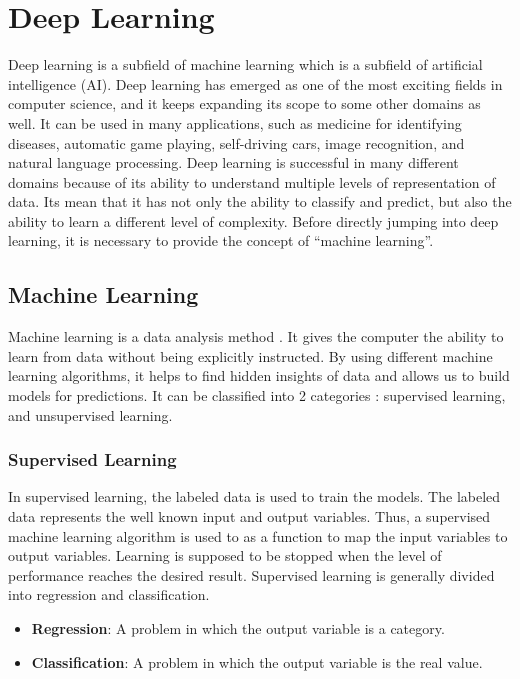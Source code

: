 \chapter{Deep Learning}

Deep learning is a subfield of machine learning which is a subfield of artificial intelligence (AI). Deep learning has emerged as one of the most exciting fields in computer science, and it keeps expanding its scope to some other domains as well. It can be used in many applications, such as medicine for identifying diseases, automatic game playing, self-driving cars, image recognition, and natural language processing. Deep learning is successful in many different domains because of its ability to understand multiple levels of representation of data. Its mean that it has not only the ability to classify and predict, but also the ability to learn a different level of complexity. Before directly jumping into deep learning, it is necessary to provide the concept of ``machine learning''.

\section{Machine Learning}

Machine learning is a data analysis method \cite{bishop2006pattern}. It gives the computer the ability to learn from data without being explicitly instructed. By using different machine learning algorithms, it helps to find hidden insights of data and allows us to build models for predictions. It can be classified into 2 categories \cite{machinelearningmastery}: supervised learning, and unsupervised learning.


\subsection{Supervised Learning}

In supervised learning, the labeled data is used to train the models. The labeled data represents the well known input and output variables. Thus, a supervised machine learning algorithm is used to as a function to map the input variables to output variables. Learning is supposed to be stopped when the level of performance reaches the desired result. Supervised learning is generally divided into regression and classification.
\begin{itemize}
	\item \textbf{Regression}: A problem in which the output variable is a category.
	\item \textbf{Classification}: A problem in which the output variable is the real value.
\end{itemize}

